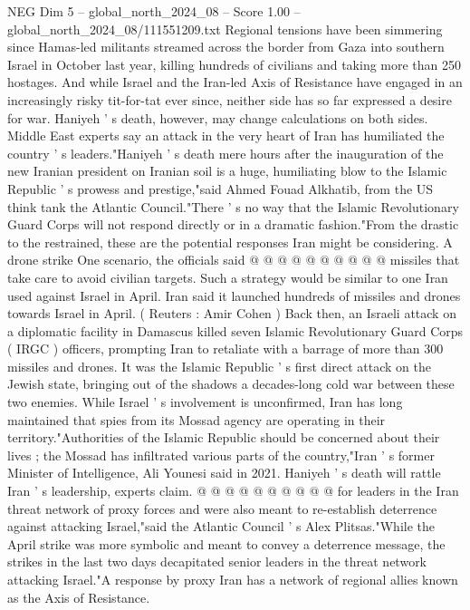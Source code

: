 \begin{textsample}{NEG Dim 5 – global\_north\_2024\_08 – Score 1.00 – global\_north\_2024\_08/111551209.txt}  \label{ex:f5_neg_073}
Regional tensions have been simmering since Hamas-led militants streamed across the border from Gaza into southern Israel in October last year, killing hundreds of civilians and taking more than 250 hostages.
And while Israel and the Iran-led Axis of Resistance have engaged in an increasingly risky tit-for-tat ever since, neither side has so far expressed a desire for war.
Haniyeh ' s death, however, may change calculations on both sides.
Middle East experts say an attack in the very heart of Iran has humiliated the country ' s leaders."Haniyeh ' s death mere hours after the inauguration of the new Iranian president on Iranian soil is a huge, humiliating blow to the Islamic Republic ' s prowess and prestige,"said Ahmed Fouad Alkhatib, from the US think tank the Atlantic Council."There ' s no way that the Islamic Revolutionary Guard Corps will not respond directly or in a dramatic fashion."From the drastic to the restrained, these are the potential responses Iran might be considering.
A drone strike One scenario, the officials said @ @ @ @ @ @ @ @ @ @ missiles that take care to avoid civilian targets.
Such a strategy would be similar to one Iran used against Israel in April.
Iran said it launched hundreds of missiles and drones towards Israel in April. ( Reuters : Amir Cohen ) Back then, an Israeli attack on a diplomatic facility in Damascus killed seven Islamic Revolutionary Guard Corps ( IRGC ) officers, prompting Iran to retaliate with a barrage of more than 300 missiles and drones.
It was the Islamic Republic ' s first direct attack on the Jewish state, bringing out of the shadows a decades-long cold war between these two enemies.
While Israel ' s involvement is unconfirmed, Iran has long maintained that spies from its Mossad agency are operating in their territory."Authorities of the Islamic Republic should be concerned about their lives ; the Mossad has infiltrated various parts of the country,"Iran ' s former Minister of Intelligence, Ali Younesi said in 2021.
Haniyeh ' s death will rattle Iran ' s leadership, experts claim. @ @ @ @ @ @ @ @ @ @ for leaders in the Iran threat network of proxy forces and were also meant to re-establish deterrence against attacking Israel,"said the Atlantic Council ' s Alex Plitsas."While the April strike was more symbolic and meant to convey a deterrence message, the strikes in the last two days decapitated senior leaders in the threat network attacking Israel."A response by proxy Iran has a network of regional allies known as the Axis of Resistance.

\end{textsample}
